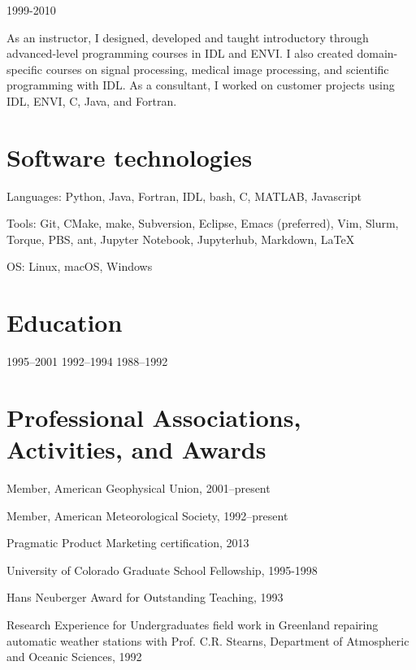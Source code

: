 \documentclass[letterpaper]{resume}
\begin{document}
            {1999-2010}
\begin{compactitem}[\itembullet]
  \item As an instructor, I designed, developed and taught
    introductory through advanced-level programming courses in IDL and
    ENVI. I also created domain-specific courses on signal processing,
    medical image processing, and scientific programming with IDL. As
    a consultant, I worked on customer projects using IDL, ENVI, C,
    Java, and Fortran.
\end{compactitem}


\section{Software technologies}

\vspace{0.5em}
\begin{compactitem}[\itembullet]
  \item Languages: Python, Java, Fortran, IDL, bash, C, MATLAB, Javascript
  \item Tools: Git, CMake, make, Subversion, Eclipse, Emacs
    (preferred), Vim, Slurm, Torque, PBS, ant, Jupyter Notebook,
    Jupyterhub, Markdown, \LaTeX
  \item OS: Linux, macOS, Windows
\end{compactitem}


\section{Education}

            {1995--2001}
            {1992--1994}
            {1988--1992}


\section{Professional Associations, Activities, and Awards}

\vspace{0.5em}
\begin{compactitem}[\itembullet]
  \item Member, American Geophysical Union, 2001--present
  \item Member, American Meteorological Society, 1992--present
  \item Pragmatic Product Marketing certification, 2013
  \item University of Colorado Graduate School Fellowship, 1995-1998
  \item Hans Neuberger Award for Outstanding Teaching, 1993
  \item Research Experience for Undergraduates field work in Greenland
    repairing automatic weather stations with Prof. C.R. Stearns,
    Department of Atmospheric and Oceanic Sciences, 1992
\end{compactitem}
\end{document}
